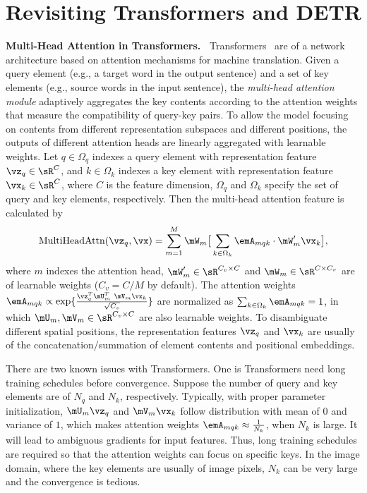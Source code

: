\section{Revisiting Transformers and DETR}
\label{sec:revisit}


\textbf{Multi-Head Attention in Transformers.~} Transformers~\citep{vaswani2017attention} are of a network architecture based on attention mechanisms for machine translation. Given a query element (e.g., a target word in the output sentence) and a set of key elements (e.g., source words in the input sentence), the \emph{multi-head attention module} adaptively aggregates the key contents according to the attention weights that measure the compatibility of query-key pairs. To allow the model focusing on contents from different representation subspaces and different positions, the outputs of different attention heads are linearly aggregated with learnable weights. Let $q\in\Omega_q$ indexes a query element with representation feature $\vz_q \in \sR^{C}$, and $k\in\Omega_k$ indexes a key element with representation feature $\vx_k \in \sR^{C}$, where $C$ is the feature dimension, $\Omega_q$ and $\Omega_k$ specify the set of query and key elements, respectively. Then the multi-head attention feature is calculated by
\begin{equation}
\text{MultiHeadAttn}(\vz_q, \vx) = \sum_{m=1}^{M} \mW_m \big[\sum_{k\in\Omega_k} \emA_{mqk} \cdot \mW'_m \vx_k \big],
\label{eq:trans_attn_fun}
\end{equation}
where $m$ indexes the attention head, $\mW'_m \in \sR^{C_v \times C}$ and $\mW_m \in \sR^{C \times C_v}$ are of learnable weights ($C_v = C/M$ by default). The attention weights $\emA_{mqk} \propto \exp\{\frac{\vz_q^T \mU_m^T~ \mV_m \vx_k}{\sqrt{C_v}}\}$ are normalized as $\sum_{k\in\Omega_k} \emA_{mqk} = 1$, in which $\mU_m, \mV_m \in \sR^{C_v \times C}$ are also learnable weights. To disambiguate different spatial positions, the representation features $\vz_q$ and $\vx_k$ are usually of the concatenation/summation of element contents and positional embeddings.


There are two known issues with Transformers. One is Transformers need long training schedules before convergence. Suppose the number of query and key elements are of $N_q$ and $N_k$, respectively.
Typically, with proper parameter initialization, $\mU_m \vz_q$ and $\mV_m \vx_k$ follow distribution with mean of $0$ and variance of $1$, which makes attention weights $\emA_{mqk} \approx \frac{1}{N_k}$, when $N_k$ is large.
It will lead to ambiguous gradients for input features. Thus, long training schedules are required so that the attention weights can focus on specific keys. In the image domain, where the key elements are usually of image pixels, $N_k$ can be very large and the convergence is tedious.


